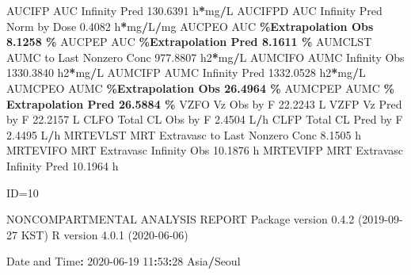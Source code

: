 \documentclass[
  10pt,
]{krantz}
\makeatletter
\newenvironment{Shaded}{\begin{snugshade}}{\end{snugshade}}
\newcommand{\DecValTok}[1]{\textcolor[rgb]{0.00,0.00,0.81}{#1}}
\newcommand{\FloatTok}[1]{\textcolor[rgb]{0.00,0.00,0.81}{#1}}
\newcommand{\NormalTok}[1]{#1}
\newcommand{\OperatorTok}[1]{\textcolor[rgb]{0.81,0.36,0.00}{\textbf{#1}}}
\newcommand{\StringTok}[1]{\textcolor[rgb]{0.31,0.60,0.02}{#1}}
\newenvironment{kframe}{%
\medskip{}
\setlength{\fboxsep}{.8em}
 \def\at@end@of@kframe{}%
 \ifinner\ifhmode%
  \def\at@end@of@kframe{\end{minipage}}%
  \begin{minipage}{\columnwidth}%
 \fi\fi%
 \def\FrameCommand##1{\hskip\@totalleftmargin \hskip-\fboxsep
 \colorbox{shadecolor}{##1}\hskip-\fboxsep
     \hskip-\linewidth \hskip-\@totalleftmargin \hskip\columnwidth}%
 \MakeFramed {\advance\hsize-\width
   \@totalleftmargin\z@ \linewidth\hsize
   \@setminipage}}%
 {\par\unskip\endMakeFramed%
 \at@end@of@kframe}
\renewenvironment{Shaded}{\begin{kframe}}{\end{kframe}}
\makeatother
\begin{document}
\begin{Shaded}
\begin{Highlighting}[]
\NormalTok{AUCIFP     AUC Infinity Pred                             }\FloatTok{130.6391}\NormalTok{ h}\OperatorTok{*}\NormalTok{mg}\OperatorTok{/}\NormalTok{L}
\NormalTok{AUCIFPD    AUC Infinity Pred Norm by Dose                  }\FloatTok{0.4082}\NormalTok{ h}\OperatorTok{*}\NormalTok{mg}\OperatorTok{/}\NormalTok{L}\OperatorTok{/}\NormalTok{mg}
\NormalTok{AUCPEO     AUC }\OperatorTok{\%Extrapolation Obs                          8.1258 \%}
\NormalTok{AUCPEP     AUC }\OperatorTok{\%Extrapolation Pred                         8.1611 \%}
\NormalTok{AUMCLST    AUMC to Last Nonzero Conc                     }\FloatTok{977.8807}\NormalTok{ h2}\OperatorTok{*}\NormalTok{mg}\OperatorTok{/}\NormalTok{L}
\NormalTok{AUMCIFO    AUMC Infinity Obs                            }\FloatTok{1330.3840}\NormalTok{ h2}\OperatorTok{*}\NormalTok{mg}\OperatorTok{/}\NormalTok{L}
\NormalTok{AUMCIFP    AUMC Infinity Pred                           }\FloatTok{1332.0528}\NormalTok{ h2}\OperatorTok{*}\NormalTok{mg}\OperatorTok{/}\NormalTok{L}
\NormalTok{AUMCPEO    AUMC }\OperatorTok{\%Extrapolation Obs                        26.4964 \%}
\NormalTok{AUMCPEP    AUMC }\OperatorTok{\% Extrapolation Pred                      26.5884 \%}
\NormalTok{VZFO       Vz Obs by F                                    }\FloatTok{22.2243}\NormalTok{ L}
\NormalTok{VZFP       Vz Pred by F                                   }\FloatTok{22.2157}\NormalTok{ L}
\NormalTok{CLFO       Total CL Obs by F                               }\FloatTok{2.4504}\NormalTok{ L}\OperatorTok{/}\NormalTok{h}
\NormalTok{CLFP       Total CL Pred by F                              }\FloatTok{2.4495}\NormalTok{ L}\OperatorTok{/}\NormalTok{h}
\NormalTok{MRTEVLST   MRT Extravasc to Last Nonzero Conc              }\FloatTok{8.1505}\NormalTok{ h}
\NormalTok{MRTEVIFO   MRT Extravasc Infinity Obs                     }\FloatTok{10.1876}\NormalTok{ h}
\NormalTok{MRTEVIFP   MRT Extravasc Infinity Pred                    }\FloatTok{10.1964}\NormalTok{ h}





\NormalTok{ID=}\DecValTok{10}

\NormalTok{                        NONCOMPARTMENTAL ANALYSIS REPORT}
\NormalTok{                       Package version }\DecValTok{0}\NormalTok{.}\FloatTok{4.2}\NormalTok{ (}\DecValTok{2019{-}09{-}27}\NormalTok{ KST)}
\NormalTok{                          R version }\DecValTok{4}\NormalTok{.}\FloatTok{0.1}\NormalTok{ (}\DecValTok{2020{-}06{-}06}\NormalTok{)}

\NormalTok{Date and Time}\OperatorTok{:}\StringTok{ }\DecValTok{2020{-}06{-}19} \DecValTok{11}\OperatorTok{:}\DecValTok{53}\OperatorTok{:}\DecValTok{28}\NormalTok{ Asia}\OperatorTok{/}\NormalTok{Seoul}


\end{Highlighting}
\end{Shaded}
\end{document}
